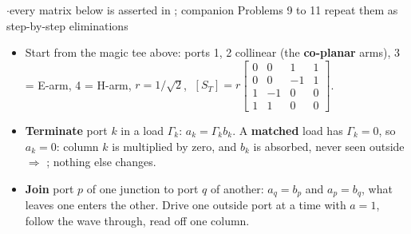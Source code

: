 \par{}
{\color{sub}\footnotesize {}  \gap$\cdot$\gap every matrix below is asserted in ; companion Problems 9 to 11 repeat them as step-by-step eliminations}
\begin{itemize}
  \item Start from the magic tee above: ports 1, 2 collinear (the \textbf{co-planar} arms),
    3 = E-arm, 4 = H-arm, $r = 1/\sqrt{2}$,
    $\;[S_T] = r\left[\begin{smallmatrix} 0&0&1&1\\ 0&0&-1&1\\ 1&-1&0&0\\ 1&1&0&0 \end{smallmatrix}\right]$.
  \item \textbf{Terminate} port $k$ in a load $\Gamma_k$: $a_k = \Gamma_k b_k$. A
    \textbf{matched} load has $\Gamma_k = 0$, so $a_k = 0$: column $k$ is multiplied by zero,
    and $b_k$ is absorbed, never seen outside $\Rightarrow$ ; nothing else changes.
  \item \textbf{Join} port $p$ of one junction to port $q$ of another: $a_q = b_p$ and
    $a_p = b_q$, what leaves one enters the other. Drive one outside port at a time with
    $a = 1$, follow the wave through, read off one column.
\end{itemize}

